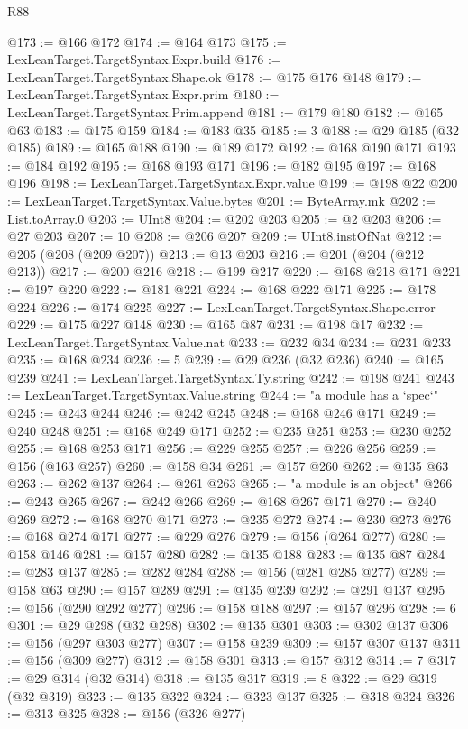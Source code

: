 \begin{lexlean}{R88}
\begin{coremodule}
@173 := @166 @172
@174 := @164 @173
@175 := LexLeanTarget.TargetSyntax.Expr.build
@176 := LexLeanTarget.TargetSyntax.Shape.ok
@178 := @175 @176 @148
@179 := LexLeanTarget.TargetSyntax.Expr.prim
@180 := LexLeanTarget.TargetSyntax.Prim.append
@181 := @179 @180
@182 := @165 @63
@183 := @175 @159
@184 := @183 @35
@185 := 3
@188 := @29 @185 (@32 @185)
@189 := @165 @188
@190 := @189 @172
@192 := @168 @190 @171
@193 := @184 @192
@195 := @168 @193 @171
@196 := @182 @195
@197 := @168 @196
@198 := LexLeanTarget.TargetSyntax.Expr.value
@199 := @198 @22
@200 := LexLeanTarget.TargetSyntax.Value.bytes
@201 := ByteArray.mk
@202 := List.toArray.{0}
@203 := UInt8
@204 := @202 @203
@205 := @2 @203
@206 := @27 @203
@207 := 10
@208 := @206 @207
@209 := UInt8.instOfNat
@212 := @205 (@208 (@209 @207))
@213 := @13 @203
@216 := @201 (@204 (@212 @213))
@217 := @200 @216
@218 := @199 @217
@220 := @168 @218 @171
@221 := @197 @220
@222 := @181 @221
@224 := @168 @222 @171
@225 := @178 @224
@226 := @174 @225
@227 := LexLeanTarget.TargetSyntax.Shape.error
@229 := @175 @227 @148
@230 := @165 @87
@231 := @198 @17
@232 := LexLeanTarget.TargetSyntax.Value.nat
@233 := @232 @34
@234 := @231 @233
@235 := @168 @234
@236 := 5
@239 := @29 @236 (@32 @236)
@240 := @165 @239
@241 := LexLeanTarget.TargetSyntax.Ty.string
@242 := @198 @241
@243 := LexLeanTarget.TargetSyntax.Value.string
@244 := "a module has a `spec`"
@245 := @243 @244
@246 := @242 @245
@248 := @168 @246 @171
@249 := @240 @248
@251 := @168 @249 @171
@252 := @235 @251
@253 := @230 @252
@255 := @168 @253 @171
@256 := @229 @255
@257 := @226 @256
@259 := @156 (@163 @257)
@260 := @158 @34
@261 := @157 @260
@262 := @135 @63
@263 := @262 @137
@264 := @261 @263
@265 := "a module is an object"
@266 := @243 @265
@267 := @242 @266
@269 := @168 @267 @171
@270 := @240 @269
@272 := @168 @270 @171
@273 := @235 @272
@274 := @230 @273
@276 := @168 @274 @171
@277 := @229 @276
@279 := @156 (@264 @277)
@280 := @158 @146
@281 := @157 @280
@282 := @135 @188
@283 := @135 @87
@284 := @283 @137
@285 := @282 @284
@288 := @156 (@281 @285 @277)
@289 := @158 @63
@290 := @157 @289
@291 := @135 @239
@292 := @291 @137
@295 := @156 (@290 @292 @277)
@296 := @158 @188
@297 := @157 @296
@298 := 6
@301 := @29 @298 (@32 @298)
@302 := @135 @301
@303 := @302 @137
@306 := @156 (@297 @303 @277)
@307 := @158 @239
@309 := @157 @307 @137
@311 := @156 (@309 @277)
@312 := @158 @301
@313 := @157 @312
@314 := 7
@317 := @29 @314 (@32 @314)
@318 := @135 @317
@319 := 8
@322 := @29 @319 (@32 @319)
@323 := @135 @322
@324 := @323 @137
@325 := @318 @324
@326 := @313 @325
@328 := @156 (@326 @277)

\end{coremodule}
\end{lexlean}
